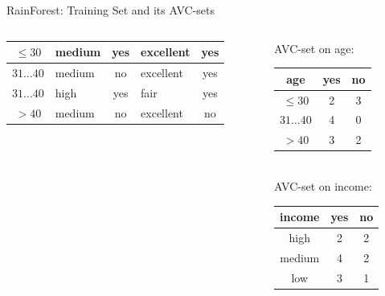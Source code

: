 \documentclass[aspectratio=169,t,table]{beamer}
\begin{document}
{\begin{frame}{RainForest: Training Set and its AVC-sets}
\begin{columns}
\begin{column}{0.6\textwidth}
\begin{tabular}{|c|l|c|l|c|}
            \cellcolor{yellow!20}$\leq30$ & \cellcolor{yellow!20}medium & \cellcolor{yellow!20}yes & \cellcolor{yellow!20}excellent & \cellcolor{green!20}yes \\\hline
            \cellcolor{yellow!20}$31\ldots40$ & \cellcolor{yellow!20}medium & \cellcolor{yellow!20}no & \cellcolor{yellow!20}excellent & \cellcolor{green!20}yes \\\hline
            \cellcolor{yellow!20}$31\ldots40$ & \cellcolor{yellow!20}high & \cellcolor{yellow!20}yes & \cellcolor{yellow!20}fair & \cellcolor{green!20}yes \\\hline
            \cellcolor{yellow!20}$>40$ & \cellcolor{yellow!20}medium & \cellcolor{yellow!20}no & \cellcolor{yellow!20}excellent & \cellcolor{red!20}no \\\hline
          \end{tabular}
        \end{column}
        \begin{column}{0.3\textwidth}
          \vspace{-3cm}

          \centering
          AVC-set on age:\\
          \begin{tabular}{|c|c|c|}
            \hline
            age & yes & no \\\hline
            $\leq 30$ & 2 & 3 \\\hline
            $31\ldots40$ & 4 & 0 \\\hline
            $>40$ & 3 & 2 \\\hline
          \end{tabular}\\[1cm]
          AVC-set on income:\\
          \begin{tabular}{|c|c|c|}
            \hline
            income & yes & no \\\hline
            high & 2 & 2 \\\hline
            medium & 4 & 2 \\\hline
            low & 3 & 1 \\\hline
          \end{tabular}
        \end{column}
      \end{columns}
    \end{frame}
  }
\end{document}
